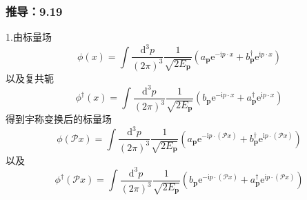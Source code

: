 \subsubsection{推导：9.19}
1.由标量场
\begin{equation}
    \phi (x)=\int{\frac{\mathrm{d}^3p}{\left( 2\pi \right) ^3}}\frac{1}{\sqrt{2E_{\mathbf{p}}}}\left( a_{\mathbf{p}}\mathrm{e}^{-\mathrm{i}p\cdot x}+b_{\mathbf{p}}^{\dagger}\mathrm{e}^{\mathrm{i}p\cdot x} \right) 
\end{equation}
以及复共轭
\begin{equation}
    \phi ^{\dagger}(x)=\int{\frac{\mathrm{d}^3p}{\left( 2\pi \right) ^3}}\frac{1}{\sqrt{2E_{\mathbf{p}}}}\left( b_{\mathbf{p}}\mathrm{e}^{-\mathrm{i}p\cdot x}+a_{\mathbf{p}}^{\dagger}\mathrm{e}^{\mathrm{i}p\cdot x} \right) 
\end{equation}
得到宇称变换后的标量场
\begin{equation}
    \phi (\mathcal{P} x)=\int{\frac{\mathrm{d}^3p}{\left( 2\pi \right) ^3}}\frac{1}{\sqrt{2E_{\mathbf{p}}}}\left( a_{\mathbf{p}}\mathrm{e}^{-\mathrm{i}p\cdot \left( \mathcal{P} x \right)}+b_{\mathbf{p}}^{\dagger}\mathrm{e}^{\mathrm{i}p\cdot \left( \mathcal{P} x \right)} \right) 
\end{equation}
以及
\begin{equation}
    \phi ^{\dagger}(\mathcal{P} x)=\int{\frac{\mathrm{d}^3p}{\left( 2\pi \right) ^3}}\frac{1}{\sqrt{2E_{\mathbf{p}}}}\left( b_{\mathbf{p}}\mathrm{e}^{-\mathrm{i}p\cdot \left( \mathcal{P} x \right)}+a_{\mathbf{p}}^{\dagger}\mathrm{e}^{\mathrm{i}p\cdot \left( \mathcal{P} x \right)} \right) 
\end{equation}

